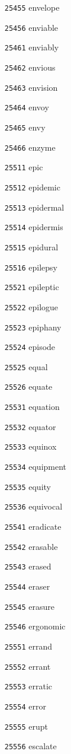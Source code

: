 \documentclass[twoside,11pt]{article}
\begin{document}
\begin{multicols}{5}
\begin{enumerate}
\item[\texttt{25455}] envelope
\item[\texttt{25456}] enviable
\item[\texttt{25461}] enviably
\item[\texttt{25462}] envious
\item[\texttt{25463}] envision
\item[\texttt{25464}] envoy
\item[\texttt{25465}] envy
\item[\texttt{25466}] enzyme
\item[\texttt{25511}] epic
\item[\texttt{25512}] epidemic
\item[\texttt{25513}] epidermal
\item[\texttt{25514}] epidermis
\item[\texttt{25515}] epidural
\item[\texttt{25516}] epilepsy
\item[\texttt{25521}] epileptic
\item[\texttt{25522}] epilogue
\item[\texttt{25523}] epiphany
\item[\texttt{25524}] episode
\item[\texttt{25525}] equal
\item[\texttt{25526}] equate
\item[\texttt{25531}] equation
\item[\texttt{25532}] equator
\item[\texttt{25533}] equinox
\item[\texttt{25534}] equipment
\item[\texttt{25535}] equity
\item[\texttt{25536}] equivocal
\item[\texttt{25541}] eradicate
\item[\texttt{25542}] erasable
\item[\texttt{25543}] erased
\item[\texttt{25544}] eraser
\item[\texttt{25545}] erasure
\item[\texttt{25546}] ergonomic
\item[\texttt{25551}] errand
\item[\texttt{25552}] errant
\item[\texttt{25553}] erratic
\item[\texttt{25554}] error
\item[\texttt{25555}] erupt
\item[\texttt{25556}] escalate

\end{enumerate}
\end{multicols}
\end{document}
